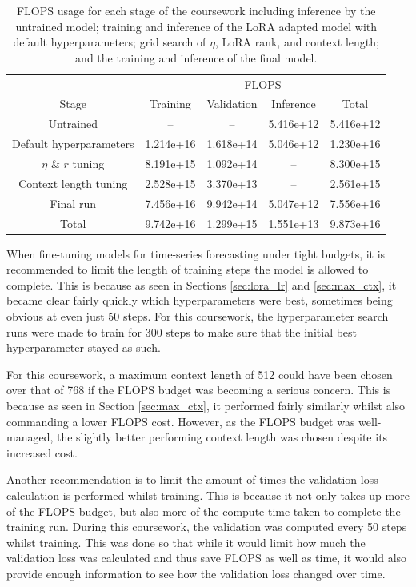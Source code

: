 \documentclass[11pt,a4paper]{article}
\begin{document}
\begin{table}[h]
    \centering
    \begin{tabular}{c|c|c|c|c}
        & \multicolumn{4}{|c}{FLOPS}\\
        Stage & Training & Validation & Inference & Total \\
        \hline
        Untrained & -- & -- & 5.416e+12 & 5.416e+12 \\
        Default hyperparameters & 1.214e+16 & 1.618e+14 & 5.046e+12 & 1.230e+16 \\
        $\eta$ \& $r$ tuning & 8.191e+15 & 1.092e+14 & -- & 8.300e+15 \\
        Context length tuning & 2.528e+15 & 3.370e+13 & -- & 2.561e+15 \\
        Final run & 7.456e+16 & 9.942e+14 & 5.047e+12 & 7.556e+16 \\
        \hline
        Total & 9.742e+16 & 1.299e+15 & 1.551e+13 & 9.873e+16 \\
    \end{tabular}
    \caption{FLOPS usage for each stage of the coursework including inference by the untrained model; training and inference of the LoRA adapted model with default hyperparameters; grid search of $\eta$, LoRA rank, and context length; and the training and inference of the final model.}
    \label{tab:flops_track}
\end{table}

When fine-tuning models for time-series forecasting under tight budgets, it is recommended to limit the length of training steps the model is allowed to complete. This is because as seen in Sections \ref{sec:lora_lr} and \ref{sec:max_ctx}, it became clear fairly quickly which hyperparameters were best, sometimes being obvious at even just 50 steps. For this coursework, the hyperparameter search runs were made to train for 300 steps to make sure that the initial best hyperparameter stayed as such.

For this coursework, a maximum context length of 512 could have been chosen over that of 768 if the FLOPS budget was becoming a serious concern. This is because as seen in Section \ref{sec:max_ctx}, it performed fairly similarly whilst also commanding a lower FLOPS cost. However, as the FLOPS budget was well-managed, the slightly better performing context length was chosen despite its increased cost.

Another recommendation is to limit the amount of times the validation loss calculation is performed whilst training. This is because it not only takes up more of the FLOPS budget, but also more of the compute time taken to complete the training run. During this coursework, the validation was computed every 50 steps whilst training. This was done so that while it would limit how much the validation loss was calculated and thus save FLOPS as well as time, it would also provide enough information to see how the validation loss changed over time.
\end{document}
